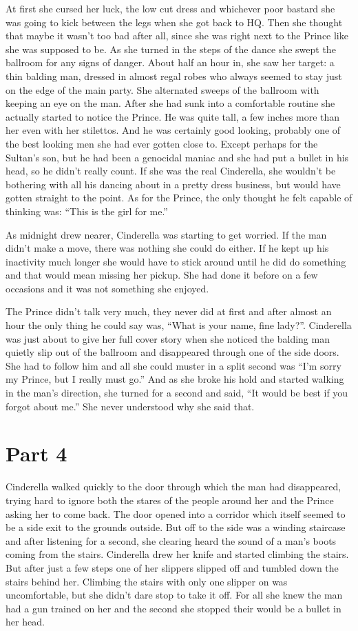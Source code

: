 \documentclass[12pt,letterpaper]{article}
\begin{document}
At first she cursed her luck, the low cut dress and whichever poor bastard she was going to kick between the legs when she got back to HQ. Then she thought that maybe it wasn't too bad after all, since she was right next to the Prince like she was supposed to be. As she turned in the steps of the dance she swept the ballroom for any signs of danger. About half an hour in, she saw her target: a thin balding man, dressed in almost regal robes who always seemed to stay just on the edge of the main party. She alternated sweeps of the ballroom with keeping an eye on the man. After she had sunk into a comfortable routine she actually started to notice the Prince. He was quite tall, a few inches more than her even with her stilettos. And he was certainly good looking, probably one of the best looking men she had ever gotten close to. Except perhaps for the Sultan's son, but he had been a genocidal maniac and she had put a bullet in his head, so he didn't really count. If she was the real Cinderella, she wouldn't be bothering with all his dancing about in a pretty dress business, but would have gotten straight to the point. As for the Prince, the only thought he felt capable of thinking was: ``This is the girl for me.''

As midnight drew nearer, Cinderella was starting to get worried. If the man didn't make a move, there was nothing she could do either. If he kept up his inactivity much longer she would have to stick around until he did do something and that would mean missing her pickup. She had done it before on a few occasions and it was not something she enjoyed.

The Prince didn't talk very much, they never did at first and after almost an hour the only thing he could say was, ``What is your name, fine lady?''. Cinderella was just about to give her full cover story when she noticed the balding man quietly slip out of the ballroom and disappeared through one of the side doors. She had to follow him and all she could muster in a split second was ``I'm sorry my Prince, but I really must go.'' And as she broke his hold and started walking in the man's direction, she turned for a second and said, ``It would be best if you forgot about me.'' She never understood why she said that.

\section*{Part 4}

Cinderella walked quickly to the door through which the man had disappeared, trying hard to ignore both the stares of the people around her and the Prince asking her to come back. The door opened into a corridor which itself seemed to be a side exit to the grounds outside. But off to the side was a winding staircase and after listening for a second, she clearing heard the sound of a man's boots coming from the stairs. Cinderella drew her knife and started climbing the stairs. But after just a few steps one of her slippers slipped off and tumbled down the stairs behind her. Climbing the stairs with only one slipper on was uncomfortable, but she didn't dare stop to take it off. For all she knew the man had a gun trained on her and the second she stopped their would be a bullet in her head.
\end{document}
